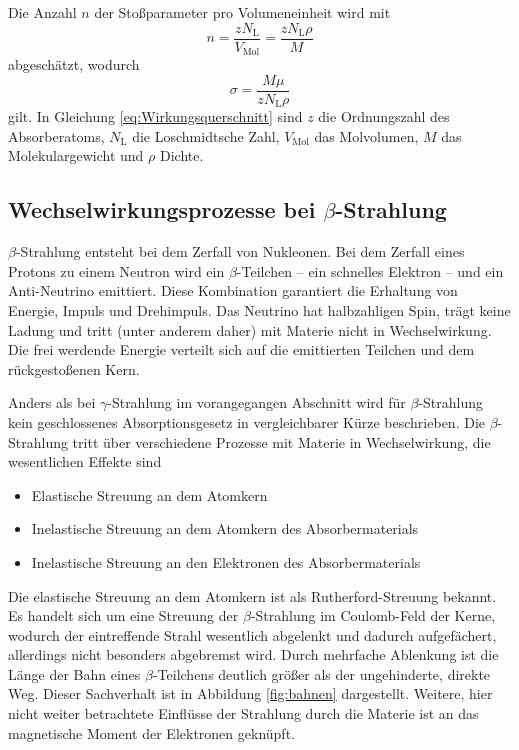 Die Anzahl $n$ der Stoßparameter pro Volumeneinheit wird mit
\begin{equation}
	n=\frac{zN_\text{L}}{V_\text{Mol}}=\frac{zN_\text{L}\rho}{M}
\end{equation}
abgeschätzt, wodurch 
\begin{equation}
	\sigma=\frac{M\mu}{zN_\text{L}\rho}
	\label{eq:Wirkungsquerschnitt}
\end{equation}
gilt.
In Gleichung \ref{eq:Wirkungsquerschnitt} sind $z$ die Ordnungszahl des Absorberatoms, $N_\text{L}$ die Loschmidtsche Zahl, $V_\text{Mol}$ das Molvolumen, $M$ das Molekulargewicht und $\rho$ Dichte.



\subsection{Wechselwirkungsprozesse bei \texorpdfstring{$\beta$}{Beta}-Strahlung}
\label{sec:beta}
$\beta$-Strahlung entsteht bei dem Zerfall von Nukleonen.
Bei dem Zerfall eines Protons zu einem Neutron wird ein $\beta$-Teilchen -- ein schnelles Elektron -- und ein Anti-Neutrino emittiert.
Diese Kombination garantiert die Erhaltung von Energie, Impuls und Drehimpuls.
Das Neutrino hat halbzahligen Spin, trägt keine Ladung und tritt (unter anderem daher) mit Materie nicht in Wechselwirkung.
Die frei werdende Energie verteilt sich auf die emittierten Teilchen und dem rückgestoßenen Kern.

Anders als bei $\gamma$-Strahlung im vorangegangen Abschnitt wird für  $\beta$-Strahlung kein geschlossenes Absorptionsgesetz in vergleichbarer Kürze beschrieben.
Die $\beta$-Strahlung tritt über verschiedene Prozesse mit Materie in Wechselwirkung, die wesentlichen Effekte sind
\begin{itemize}
	\item{Elastische Streuung an dem Atomkern}
	\item{Inelastische Streuung an dem Atomkern des Absorbermaterials}
	\item{Inelastische Streuung an den Elektronen des Absorbermaterials}
\end{itemize}

Die elastische Streuung an dem Atomkern ist als Rutherford-Streuung bekannt.
Es handelt sich um eine Streuung der $\beta$-Strahlung im Coulomb-Feld der Kerne, wodurch der eintreffende Strahl wesentlich abgelenkt und dadurch aufgefächert, allerdings nicht besonders abgebremst wird.
Durch mehrfache Ablenkung ist die Länge der Bahn eines $\beta$-Teilchens deutlich größer als der ungehinderte, direkte Weg.
Dieser Sachverhalt ist in Abbildung \ref{fig:bahnen} dargestellt.
Weitere, hier nicht weiter betrachtete Einflüsse der Strahlung durch die Materie ist an das magnetische Moment der Elektronen geknüpft.

